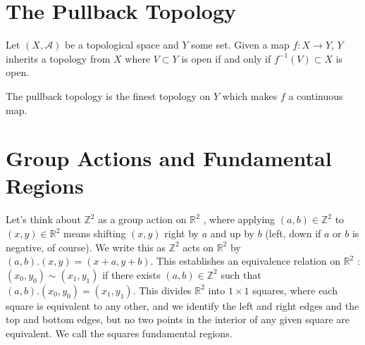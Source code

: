 
\section*{The Pullback Topology}

Let $(X,\mathcal{A})$ be a topological space and $Y$ some set.  Given a map $f:X\rightarrow Y$, $Y$ inherits a topology from $X$ where $V\subset Y$ is open if and only if $f^{-1}(V)\subset X$ is open.


The pullback topology is the finest topology on $Y$ which makes $f$ a continuous map.


\section*{Group Actions and Fundamental Regions}

Let’s think about $\mathbb{Z}^2$ as a group action on $\mathbb{R}^2$ , where applying $(a, b) \in \mathbb{Z}^2$ to $(x, y) \in \mathbb{R}^2$ means
shifting $(x, y)$ right by $a$ and up by $b$ (left, down if $a$ or $b$ is negative, of course). We write this
as $\mathbb{Z}^2$ acts on $\mathbb{R}^2$ by $(a, b) . (x, y) = (x + a, y + b)$. This establishes an equivalence relation on $\mathbb{R}^2$ :
$(x_0 , y_0 ) ∼ (x_1 , y_1 )$ if there exists $(a, b) \in \mathbb{Z}^2$ such that $(a, b). (x_0 , y_0 ) = (x_1 , y_1 )$.
This divides $\mathbb{R}^2$ into $1 \times 1$ squares, where each square is equivalent to any other, and we identify
the left and right edges and the top and bottom edges, but no two points in the interior of any
given square are equivalent. We call the squares fundamental regions.


